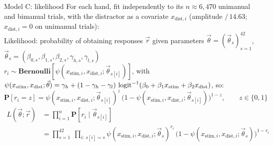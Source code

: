 \begin{frame}{Model C: likelihood}
  For each hand, fit independently to its $n \approx 6{,}470$ unimanual and bimanual trials,
  with the distractor as a covariate $x_{\text{dist},i}$ (amplitude $/\,14.63$; $x_{\text{dist},i} = 0$ on unimanual trials):\\[0.3em]
  Likelihood: probability of obtaining responses $\vec{r}$ given parameters
  $\vec{\theta} = (\vec{\theta}_s)_{s=1}^{42}$,
  $\vec{\theta}_s = (\beta_{0,s}, \beta_{1,s}, \beta_{2,s}, \gamma_{h,s}, \gamma_{l,s})$\\
  $r_i \sim \mathbf{Bernoulli}[\psi(x_{\text{stim},i}, x_{\text{dist},i};\vec{\theta}_{s[i]})]$, with
  $\psi(x_\text{stim}, x_\text{dist};\vec{\theta}) = \gamma_h + (1-\gamma_h-\gamma_l)\,\operatorname{logit}^{-1}(\beta_0 + \beta_1 x_\text{stim} + \beta_2 x_\text{dist})$, so:
  \[
    \mathbf{P}[r_i = z] = \psi(x_{\text{stim},i}, x_{\text{dist},i};\vec{\theta}_{s[i]})^{z}\,
                          \big(1-\psi(x_{\text{stim},i}, x_{\text{dist},i};\vec{\theta}_{s[i]})\big)^{1-z},
    \qquad z \in \{0, 1\}
  \]
  \begin{align*}
    L(\vec{\theta};\vec{r}) &= \prod_{i=1}^{n} \mathbf{P}[r_i \mid \vec{\theta}_{s[i]}]\\
    &= \prod_{s=1}^{42}\ \prod_{i:\, s[i]=s} \psi(x_{\text{stim},i}, x_{\text{dist},i};\vec{\theta}_s)^{r_i}\,
       \big(1-\psi(x_{\text{stim},i}, x_{\text{dist},i};\vec{\theta}_s)\big)^{1-r_i}
  \end{align*}
\end{frame}

